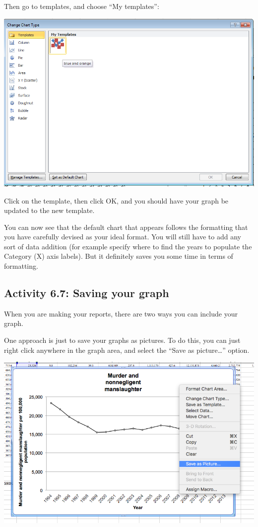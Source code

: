 \documentclass[
]{book}
\begin{document}
Then go to templates, and choose ``My templates'':

\includegraphics{imgs/pc_my_templates.png}

Click on the template, then click OK, and you should have your graph be updated to the new template.

You can now see that the default chart that appears follows the formatting that you have carefully devised as your ideal format. You will still have to add any sort of data addition (for example specify where to find the years to populate the Category (X) axis labels). But it definitely saves you some time in terms of formatting.

\hypertarget{activity-6.7-saving-your-graph}{%
\subsection{Activity 6.7: Saving your graph}\label{activity-6.7-saving-your-graph}}

When you are making your reports, there are two ways you can include your graph.

One approach is just to save your graphs as pictures. To do this, you can just right click anywhere in the graph area, and select the ``Save as picture\ldots{}'' option.

\includegraphics{imgs/save_as_pic.png}
\end{document}
